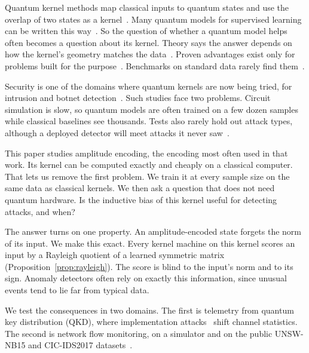 \documentclass[pdflatex,sn-mathphys-num,lineno]{sn-jnl}
\theoremstyle{thmstyleone}
\begin{document}
Quantum kernel methods map classical inputs to quantum states and use the overlap
of two states as a kernel~\cite{havlicek2019supervised,schuld2021supervised}. Many
quantum models for supervised learning can be written this
way~\cite{schuld2021supervised}. So the question of whether a quantum model helps
often becomes a question about its kernel. Theory says the answer depends on how
the kernel's geometry matches the data~\cite{huang2021power,kubler2021inductive}.
Proven advantages exist only for problems built for the
purpose~\cite{liu2021rigorous}. Benchmarks on standard data rarely find
them~\cite{bowles2024better}.

Security is one of the domains where quantum kernels are now being tried, for
intrusion and botnet
detection~\cite{kalinin2023security,suryotrisongko2022evaluating}. Such studies
face two problems. Circuit simulation is slow, so quantum models are often trained
on a few dozen samples while classical baselines see thousands. Tests also rarely
hold out attack types, although a deployed detector will meet attacks it never
saw~\cite{sommer2010outside}.

This paper studies amplitude encoding, the encoding most often used in that work.
Its kernel can be computed exactly and cheaply on a classical computer. That lets
us remove the first problem. We train it at every sample size on the same data as
classical kernels. We then ask a question that does not need quantum hardware. Is
the inductive bias of this kernel useful for detecting attacks, and when?

The answer turns on one property. An amplitude-encoded state forgets the norm of
its input. We make this exact. Every kernel machine on this kernel scores an input
by a Rayleigh quotient of a learned symmetric matrix
(Proposition~\ref{prop:rayleigh}). The score is blind to the input's norm and to
its sign. Anomaly detectors often rely on exactly this information, since unusual
events tend to lie far from typical data.

We test the consequences in two domains. The first is telemetry from quantum key
distribution (QKD), where implementation
attacks~\cite{huttner1995photon,lydersen2010hacking,gisin2006trojan,bennett1992experimental}
shift channel statistics. The second is network flow monitoring, on a simulator
and on the public UNSW-NB15 and CIC-IDS2017
datasets~\cite{moustafa2015unsw,sharafaldin2018toward}.
\end{document}

